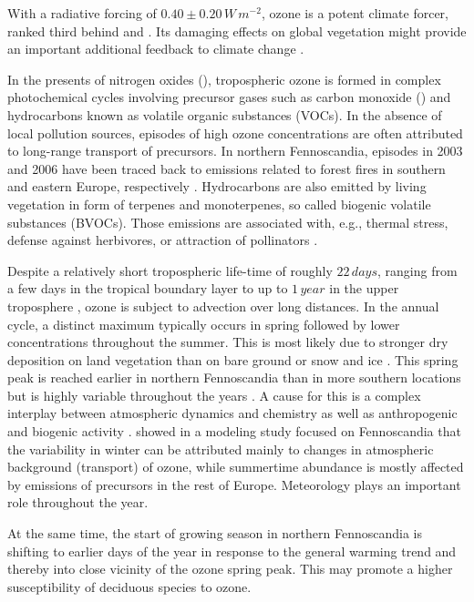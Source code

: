\documentclass[bg, manuscript]{copernicus}
\begin{document}
With a radiative forcing of $0.40 \pm 0.20\,\unit{W\,m^{-2}}$, ozone is a potent climate forcer, ranked third behind  and  \citep[Chapter 8]{IPCC2013}. Its damaging effects on global vegetation might provide an important additional feedback to climate change \citep{Nat:Sitch2007}.

In the presents of nitrogen oxides (), tropospheric ozone is formed in complex photochemical cycles involving precursor gases such as carbon monoxide () and hydrocarbons known as volatile organic substances (VOCs). In the absence of local pollution sources, episodes of high ozone concentrations are often attributed to long-range transport of precursors. In northern Fennoscandia, episodes in 2003 and 2006 have been traced back to emissions related to forest fires in southern and eastern Europe, respectively \citep{AE:Lindskog2007,EP:Karlsson2013}. Hydrocarbons are also emitted by living vegetation in form of terpenes and monoterpenes, so called biogenic volatile substances (BVOCs). Those emissions are associated with, e.g., thermal stress, defense against herbivores, or attraction of pollinators \citep{TPS:Penuelas2003}.

Despite a relatively short tropospheric life-time of roughly $22\,\unit{days}$, ranging from a few days in the tropical boundary layer to up to $1\,\unit{year}$ in the upper troposphere \citep{JGR:Stevenson2005,ACP:Young2013}, ozone is subject to advection over long distances.
In the annual cycle, a distinct maximum typically occurs in spring followed by lower concentrations throughout the summer. This is most likely due to stronger dry deposition on land vegetation than on bare ground or snow and ice \citep{AE:Monks2000}. This spring peak is reached earlier in northern Fennoscandia than in more southern locations but is highly variable throughout the years \citep{AB:Klingberg2009, BER:Klingberg2019}. A cause for this is a complex interplay between atmospheric dynamics and chemistry \citep{AE:Laurila1996,BER:Hatakka2003} as well as anthropogenic and biogenic activity \citep{AE:Rummukainen1996,AE:Simpson2002,QJRMS:Galbally2007,NGS:Schnell2009}. \citet{ACP:Andersson2017} showed in a modeling study focused on Fennoscandia that the variability in winter can be attributed mainly to changes in atmospheric background (transport) of ozone, while summertime abundance is mostly affected by emissions of precursors in the rest of Europe. Meteorology plays an important role throughout the year.

At the same time, the start of growing season in northern Fennoscandia is shifting to earlier days of the year in response to the general warming trend \citep[e.g.,]{GCB:Menzel2006,RS:Hogda2013,IJB:Karlsen2007} and thereby into close vicinity of the ozone spring peak. This may promote a higher susceptibility of deciduous species to ozone.
\end{document}

